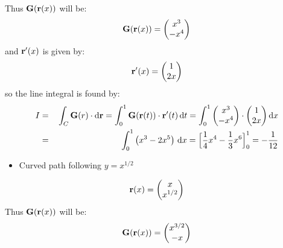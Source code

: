 \documentclass[letterpaper,10pt,english]{jupyterBook}
\begin{document}
\sphinxAtStartPar
Thus \({\bf G}({\bf r}(x))\) will be:
\begin{equation*}
\begin{split}{\bf G}({\bf r}(x)) = \begin{pmatrix} x^3 \\ -x^4 \end{pmatrix}\end{split}
\end{equation*}
\sphinxAtStartPar
and \({\bf r'}(x)\) is given by:
\begin{equation*}
\begin{split}{\bf r}'(x) = \begin{pmatrix} 1 \\ 2x \end{pmatrix}\end{split}
\end{equation*}
\sphinxAtStartPar
so the line integral is found by:
\begin{equation*}
\begin{split}I &=&\, \int_C {\bf G}(r) \cdot \mathrm{d}{\bf r} = \int_0^1 {\bf G}({\bf r}(t)) \cdot {\bf r}'(t)\,\mathrm{d}t = 
\int_0^1 \begin{pmatrix} x^3 \\ -x^4 \end{pmatrix} \cdot \begin{pmatrix} 1 \\ 2x \end{pmatrix} \mathrm{d}x \\
&=&\, \int_0^1 \left( x^3 - 2x^5 \right)\,\textrm{d}x = \Big[\frac{1}{4}x^4 - \frac{1}{3}x^6 \Big ]_0^1 = -\frac{1}{12}\end{split}
\end{equation*}\begin{itemize}
\item {} 
\sphinxAtStartPar
Curved path following \(y = x^{1/2}\)

\end{itemize}
\begin{equation*}
\begin{split}{\bf r}(x) = \begin{pmatrix} x \\ x^{1/2} \end{pmatrix}\end{split}
\end{equation*}
\sphinxAtStartPar
Thus \({\bf G}({\bf r}(x))\) will be:
\begin{equation*}
\begin{split}{\bf G}({\bf r}(x)) = \begin{pmatrix} x^{3/2} \\ -x \end{pmatrix}\end{split}
\end{equation*}
\end{document}
